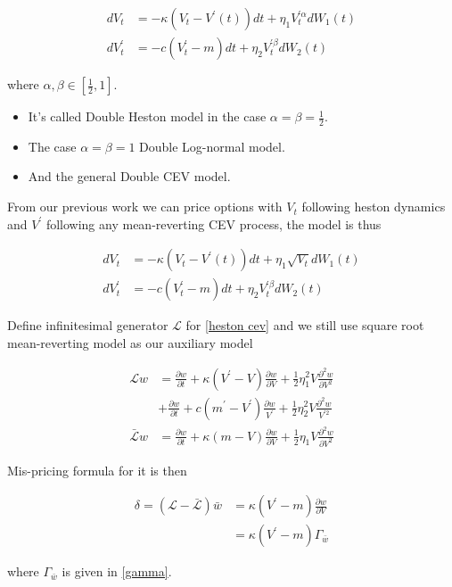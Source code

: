 $$
    \begin{aligned}
        d V_t &=-\kappa\left(V_t-V^{\prime}(t)\right) d t+\eta_{1} V^{\prime \alpha}_t  d W_1(t) \\
        d V^{\prime}_t &=-c\left(V^{\prime}_t-m\right) d t+\eta_{2} V^{\prime \beta}_t d W_{2}(t)
    \end{aligned}
$$

\noindent where $\alpha, \beta \in [\frac{1}{2},1]$.

\begin{itemize}
    \item It's called Double Heston model in the case $\alpha=\beta=\frac{1}{2}$.
    \item The case $\alpha=\beta=1$ Double Log-normal model.
    \item And the general Double CEV model.
\end{itemize}

From our previous work we can price options with $V_t$ following heston dynamics and $V^{\prime}$ following any mean-reverting CEV process, the model is thus

\begin{equation}\label{heston cev}
    \begin{aligned}
        d V_t &=-\kappa\left(V_t-V^{\prime}(t)\right) d t+\eta_{1} \sqrt{V_t} d W_1(t) \\
        d V^{\prime}_t &=-c\left(V^{\prime}_t-m\right) d t+\eta_{2} V^{\prime \beta}_t d W_{2}(t)
    \end{aligned}
\end{equation}

Define infinitesimal generator $\mathcal{L}$ for \eqref{heston cev} and we still use square root mean-reverting model as our auxiliary model

\begin{equation}\label{inf gen2}
    \begin{aligned}
        \mathcal{L} w&= \frac{\partial w}{\partial t}+\kappa(V^{\prime} - V) \frac{\partial w}{\partial V}+\frac{1}{2} \eta_1^{2} V \frac{\partial^{2} w}{\partial V^{2}} \\
        &+ \frac{\partial w}{\partial t}+c(m^{\prime} - V^{\prime}) \frac{\partial w}{V^{\prime}}+\frac{1}{2} \eta_2^{2} V \frac{\partial^{2} w}{V^{\prime 2}}\\
        \bar{\mathcal{L}} w &= \frac{\partial w}{\partial t}+\kappa(m - V) \frac{\partial w}{\partial V}+\frac{1}{2} \eta_1 V \frac{\partial^{2} w}{\partial V^{2}}
    \end{aligned}
\end{equation}

\noindent Mis-pricing formula for it is then

$$
\begin{aligned}
    \delta = (\mathcal{L} - \bar{\mathcal{L}}) \bar{w} &= \kappa(V^{\prime}-m)\frac{\partial w}{\partial V} \\
    &= \kappa(V^{\prime}-m) \Gamma_{\bar{w}}
\end{aligned}
$$

\noindent where $\Gamma_{\bar{w}}$ is given in \eqref{gamma}.
